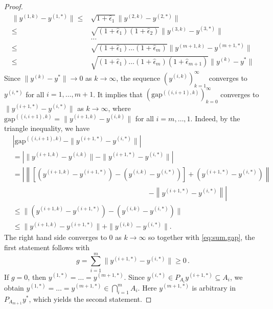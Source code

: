 \documentclass[12pt]{article}
\theoremstyle{definition}
\begin{document}
\begin{proof}
\begin{equation}
\begin{array}{rl}
        \|y^{(1,k)}-y^{(1,*)}\| \le &  \sqrt{1+\hat\epsilon_{1}} \|y^{(2,k)}-y^{(2,*)}\|\, \\
          \le &\sqrt{(1+\hat\epsilon_{1})(1+\hat\epsilon_{2})} \|y^{(3,k)}-y^{(3,*)}\| \\
          &\dots\\
          \le&\sqrt{(1+\hat\epsilon_1)\dots(1+\hat\epsilon_{m})}\|y^{(m+1,k)}-y^{(m+1,*)}\| \\
          \le&\sqrt{(1+\hat\epsilon_1)\dots(1+\hat\epsilon_{m})(1+\hat\epsilon_{m+1})}\|y^{(k)}-y^{*}\|
    \end{array}
\end{equation}
Since $\|y^{(k)}-y^*\|\to 0$ as $k\to\infty$, the sequence $(y^{(i,k)})_{k=1}^\infty$ converges to $y^{(i,*)}$ for all $i=1,\dots,m+1$.
It implies that $(\mbox{gap}^{((i,i+1),k)})_{k=0}^\infty$ converges to  $\|y^{(i+1,*)}-y^{(i,*)}\|$ as $k\to\infty$, where $\mbox{gap}^{((i,i+1),k)}=\|y^{(i+1,k)}-y^{(i,k)}\|$ for all $i=m,\dots,1$.
Indeed, by the triangle inequality, we have
\begin{equation*}
    \begin{array}{rl}
 &\left|\mbox{gap}^{((i,i+1),k)}-\|y^{(i+1,*)}-y^{(i,*)}\|\right|\\[7pt]
 &= \left|\|y^{(i+1,k)}-y^{(i,k)}\|-\|y^{(i+1,*)}-y^{(i,*)}\|\right|\\[5pt]
 &=\left|\left\|\left[\left(y^{(i+1,k)}-y^{(i+1,*)}\right)-\left(y^{(i,k)}-y^{(i,*)}\right)\right] +\left(y^{(i+1,*)}-y^{(i,*)}\right)\right\|\right.\\
 &\qquad\qquad\qquad\qquad\qquad\qquad\qquad\qquad\qquad\quad \left.-\left\|y^{(i+1,*)}-y^{(i,*)}\right\|\right|\\
 &\le  \|(y^{(i+1,k)}-y^{(i+1,*)})-(y^{(i,k)}-y^{(i,*)})\|\\%
 &\le  \|y^{(i+1,k)}-y^{(i+1,*)}\| +\|y^{(i,k)}-y^{(i,*)}\|.
    \end{array}
\end{equation*}
The right hand side converges to $0$ as  $k\to\infty$ so together with \eqref{eq:sum.gap},
the first statement follows with
\begin{equation}
    g=\sum_{i=1}^{m} \|y^{(i+1,*)}-y^{(i,*)}\|\ge 0\,.
\end{equation}
If $g=0$, then $y^{(1,*)}=\dots=y^{(m+1,*)}$.
Since $y^{(i,*)}\in P_{A_i} y^{(i+1,*)} \subseteq A_i$, we obtain $y^{(1,*)}=\dots=y^{(m+1,*)}\in  \bigcap_{i=1}^m A_i$.
Here $y^{(m+1,*)}$ is arbitrary in $P_{A_{m+1}}y^*$, which yields the second statement.
\end{proof}
\end{document}
